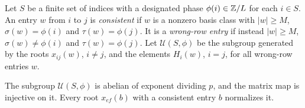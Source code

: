 Let $S$ be a finite set of indices with a designated phase $\phi(i)\in\mathbb Z/L$ for each $i\in S$. An entry $w$ from $i$ to
$j$ is \emph{consistent} if $w$ is a nonzero basis class with $|w|\geq M$, $\sigma(w)=\phi(i)$ and $\tau(w)=\phi(j)$. It
is a \emph{wrong-row entry} if instead $|w|\geq M$, $\sigma(w)\neq\phi(i)$ and $\tau(w)=\phi(j)$. Let $\mathcal U(S,\phi)$
be the subgroup generated by the roots $x_{ij}(w)$, $i\neq j$, and the elements $H_i(w)$, $i=j$, for all wrong-row
entries $w$.

\begin{lemma}\label{lem:det-wrong-row}
The subgroup $\mathcal U(S,\phi)$ is abelian of exponent dividing $p$, and the matrix map is injective on it. Every root
$x_{ef}(b)$ with a consistent entry $b$ normalizes it.
\end{lemma}

